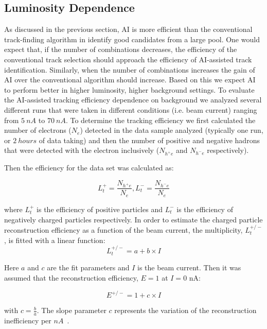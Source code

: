\subsection{Luminosity Dependence}

As discussed in the previous section, AI is more efficient than the conventional track-finding 
algorithm in identify good candidates from a large pool. One would expect that, if the number 
of combinations decreases, the efficiency of the conventional track selection should approach the 
efficiency of AI-assisted track identification. Similarly, when the number of combinations 
increases the gain of AI over the conventional algorithm should increase. Based on this we 
expect AI to perform better in higher luminosity, higher background settings. To evaluate the 
AI-assisted tracking efficiency dependence on background we analyzed several different runs 
that were taken in different conditions (i.e. beam current) ranging from $5~nA$ to $70~nA$. 
To determine the tracking efficiency we first calculated the number of electrons ($N_e$) detected 
in the data sample analyzed (typically one run, or $2~hours$ of data taking) and then the number of 
positive and negative hadrons that were detected with the electron inclusively ($N_{h^+e}$ and 
$N_{h^-e}$ respectively).

Then the efficiency for the data set was calculated as:

\begin{equation}
L_t^+ = \frac{N_{h^+e}}{N_e} , L_t^- = \frac{N_{h^-e}}{N_e} 
\end{equation}

where $L_t^+$ is the efficiency of positive particles and $L_t^-$ is the efficiency of negatively 
charged particles respectively. In order to estimate the charged particle reconstruction efficiency 
as a function of the beam current, the multiplicity, $L_t^{+/-}$, is fitted with a linear function:
\begin{equation}
L_t^{+/-} = a + b\times I 
\end{equation}

Here $a$ and $c$ are the fit parameters and $I$ is the beam current. Then it was assumed that the 
reconstruction efficiency, $E=1$ at $I=0$ nA:

\begin{equation}
E^{+/-} = 1 + c \times I 
\end{equation}

with $c=\frac{b}{a}$. The slope parameter $c$ represents the variation of the reconstruction 
inefficiency per $nA$~\cite{Stepanyan:2020bg}.
 

